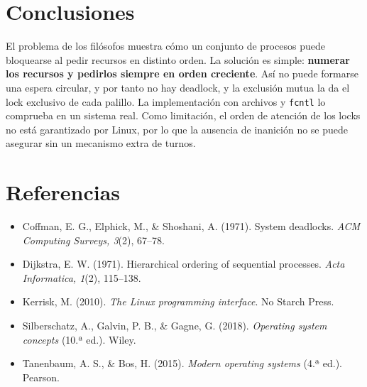 \documentclass[12pt,letterpaper]{article}
\newcommand{\cod}[1]{\texttt{#1}}
\begin{document}
\section{Conclusiones}
El problema de los filósofos muestra cómo un conjunto de procesos puede bloquearse al pedir recursos en distinto orden. La solución es simple: \textbf{numerar los recursos y pedirlos siempre en orden creciente}. Así no puede formarse una espera circular, y por tanto no hay deadlock, y la exclusión mutua la da el lock exclusivo de cada palillo. La implementación con archivos y \cod{fcntl} lo comprueba en un sistema real. Como limitación, el orden de atención de los locks no está garantizado por Linux, por lo que la ausencia de inanición no se puede asegurar sin un mecanismo extra de turnos.

\newpage
\section*{Referencias}
\begin{itemize}[leftmargin=1.5em,itemsep=6pt]
\item[] Coffman, E. G., Elphick, M., \& Shoshani, A. (1971). System deadlocks. \emph{ACM Computing Surveys, 3}(2), 67--78.
\item[] Dijkstra, E. W. (1971). Hierarchical ordering of sequential processes. \emph{Acta Informatica, 1}(2), 115--138.
\item[] Kerrisk, M. (2010). \emph{The Linux programming interface}. No Starch Press.
\item[] Silberschatz, A., Galvin, P. B., \& Gagne, G. (2018). \emph{Operating system concepts} (10.ª ed.). Wiley.
\item[] Tanenbaum, A. S., \& Bos, H. (2015). \emph{Modern operating systems} (4.ª ed.). Pearson.
\end{itemize}
\end{document}
